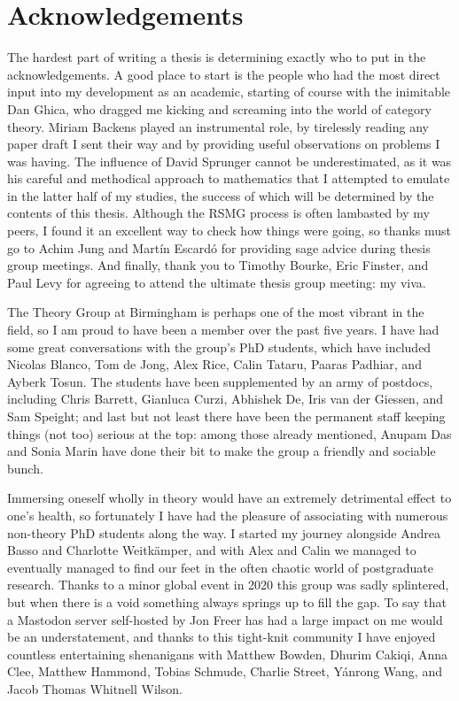 \chapter{Acknowledgements}\label{chap:acknowledgements}

The hardest part of writing a thesis is determining exactly who to put in the
acknowledgements.
A good place to start is the people who had the most direct input into my
development as an academic, starting of course with the inimitable Dan Ghica,
who dragged me kicking and screaming into the world of category theory.
Miriam Backens played an instrumental role, by tirelessly reading any paper
draft I sent their way and by providing useful observations on problems I was
having.
The influence of David Sprunger cannot be underestimated, as it was his
careful and methodical approach to mathematics that I attempted to emulate in
the latter half of my studies, the success of which will be determined by the
contents of this thesis.
Although the RSMG process is often lambasted by my peers, I found it an
excellent way to check how things were going, so thanks must go to Achim Jung
and Martín Escardó for providing sage advice during thesis group meetings.
And finally, thank you to Timothy Bourke, Eric Finster, and Paul Levy for
agreeing to attend the ultimate thesis group meeting: my viva.

The Theory Group at Birmingham is perhaps one of the most vibrant in the field,
so I am proud to have been a member over the past five years.
I have had some great conversations with the group's PhD students, which have
included Nicolas Blanco, Tom de Jong, Alex Rice, Calin Tataru,
Paaras Padhiar, and Ayberk Tosun.
The students have been supplemented by an army of postdocs,
including Chris Barrett, Gianluca Curzi, Abhishek De, Iris van der Giessen, and
Sam Speight; and last but not least there have been the permanent staff keeping
things (not too) serious at the top: among those already mentioned, Anupam Das
and Sonia Marin have done their bit to make the group a friendly and sociable
bunch.

Immersing oneself wholly in theory would have an extremely detrimental effect to
one's health, so fortunately I have had the pleasure of associating with
numerous non-theory PhD students along the way.
I started my journey alongside Andrea Basso and Charlotte Weitkämper, and with
Alex and Calin we managed to eventually managed to find our feet in the often
chaotic world of postgraduate research.
Thanks to a minor global event in 2020 this group was sadly splintered, but when
there is a void something always springs up to fill the gap.
To say that a Mastodon server self-hosted by Jon Freer has had a large impact on
me would be an understatement, and thanks to this tight-knit community I have
enjoyed countless entertaining shenanigans with Matthew Bowden, Dhurim Cakiqi,
Anna Clee, Matthew Hammond, Tobias Schmude, Charlie Street, Yánrong Wang, and
Jacob Thomas Whitnell Wilson.

